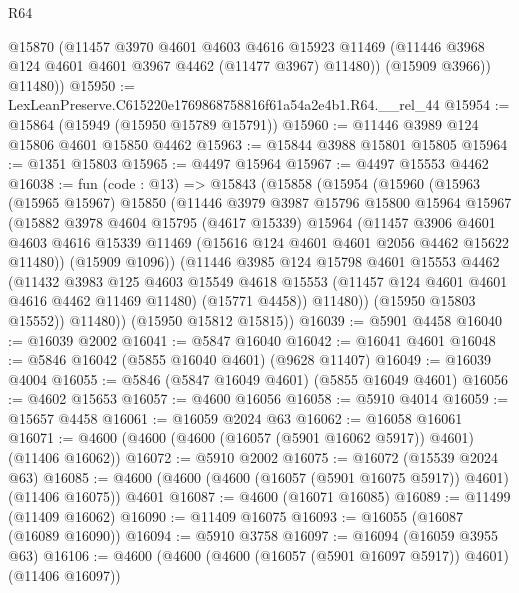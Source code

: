 \begin{lexlean}{R64}
\begin{coremodule}
          @15870
          (@11457
            @3970
            @4601
            @4603
            @4616
            @15923
            @11469
            (@11446 @3968 @124 @4601 @4601 @3967 @4462 (@11477 @3967) @11480))
          (@15909 @3966))
        @11480))
@15950 := LexLeanPreserve.C615220e1769868758816f61a54a2e4b1.R64.__rel_44
@15954 := @15864 (@15949 (@15950 @15789 @15791))
@15960 := @11446 @3989 @124 @15806 @4601 @15850 @4462
@15963 := @15844 @3988 @15801 @15805
@15964 := @1351 @15803
@15965 := @4497 @15964
@15967 := @4497 @15553 @4462
@16038 := fun (code : @13) =>
  @15843
    (@15858
      (@15954
        (@15960
          (@15963
            (@15965 @15967)
            @15850
            (@11446
              @3979
              @3987
              @15796
              @15800
              @15964
              @15967
              (@15882
                @3978
                @4604
                @15795
                (@4617 @15339)
                @15964
                (@11457
                  @3906
                  @4601
                  @4603
                  @4616
                  @15339
                  @11469
                  (@15616 @124 @4601 @4601 @2056 @4462 @15622 @11480))
                (@15909 @1096))
              (@11446
                @3985
                @124
                @15798
                @4601
                @15553
                @4462
                (@11432
                  @3983
                  @125
                  @4603
                  @15549
                  @4618
                  @15553
                  (@11457 @124 @4601 @4601 @4616 @4462 @11469 @11480)
                  (@15771 @4458))
                @11480))
            (@15950 @15803 @15552))
          @11480))
      (@15950 @15812 @15815))
@16039 := @5901 @4458
@16040 := @16039 @2002
@16041 := @5847 @16040
@16042 := @16041 @4601
@16048 := @5846 @16042 (@5855 @16040 @4601) (@9628 @11407)
@16049 := @16039 @4004
@16055 := @5846 (@5847 @16049 @4601) (@5855 @16049 @4601)
@16056 := @4602 @15653
@16057 := @4600 @16056
@16058 := @5910 @4014
@16059 := @15657 @4458
@16061 := @16059 @2024 @63
@16062 := @16058 @16061
@16071 := @4600 (@4600 (@4600 (@16057 (@5901 @16062 @5917)) @4601) (@11406 @16062))
@16072 := @5910 @2002
@16075 := @16072 (@15539 @2024 @63)
@16085 := @4600 (@4600 (@4600 (@16057 (@5901 @16075 @5917)) @4601) (@11406 @16075)) @4601
@16087 := @4600 (@16071 @16085)
@16089 := @11499 (@11409 @16062)
@16090 := @11409 @16075
@16093 := @16055 (@16087 (@16089 @16090))
@16094 := @5910 @3758
@16097 := @16094 (@16059 @3955 @63)
@16106 := @4600 (@4600 (@4600 (@16057 (@5901 @16097 @5917)) @4601) (@11406 @16097))

\end{coremodule}
\end{lexlean}
